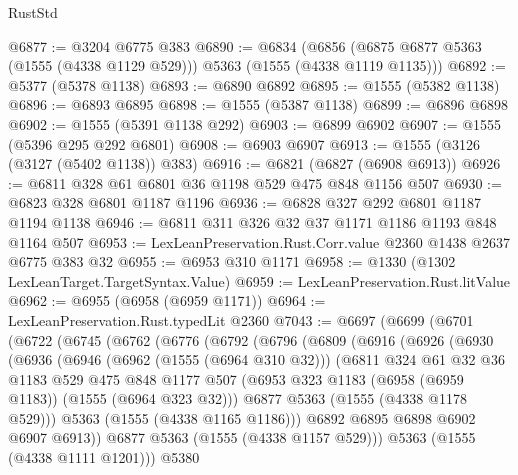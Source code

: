 \begin{lexlean}{RustStd}
\begin{coremodule}
@6877 := @3204 @6775 @383
@6890 := @6834
    (@6856 (@6875 @6877 @5363 (@1555 (@4338 @1129 @529))) @5363 (@1555 (@4338 @1119 @1135)))
@6892 := @5377 (@5378 @1138)
@6893 := @6890 @6892
@6895 := @1555 (@5382 @1138)
@6896 := @6893 @6895
@6898 := @1555 (@5387 @1138)
@6899 := @6896 @6898
@6902 := @1555 (@5391 @1138 @292)
@6903 := @6899 @6902
@6907 := @1555 (@5396 @295 @292 @6801)
@6908 := @6903 @6907
@6913 := @1555 (@3126 (@3127 (@5402 @1138)) @383)
@6916 := @6821 (@6827 (@6908 @6913))
@6926 := @6811 @328 @61 @6801 @36 @1198 @529 @475 @848 @1156 @507
@6930 := @6823 @328 @6801 @1187 @1196
@6936 := @6828 @327 @292 @6801 @1187 @1194 @1138
@6946 := @6811 @311 @326 @32 @37 @1171 @1186 @1193 @848 @1164 @507
@6953 := LexLeanPreservation.Rust.Corr.value @2360 @1438 @2637 @6775 @383 @32
@6955 := @6953 @310 @1171
@6958 := @1330 (@1302 LexLeanTarget.TargetSyntax.Value)
@6959 := LexLeanPreservation.Rust.litValue
@6962 := @6955 (@6958 (@6959 @1171))
@6964 := LexLeanPreservation.Rust.typedLit @2360
@7043 := @6697
    (@6699
      (@6701
        (@6722
          (@6745
            (@6762
              (@6776
                (@6792
                  (@6796
                    (@6809
                      (@6916
                        (@6926
                          (@6930
                            (@6936
                              (@6946
                                (@6962 (@1555 (@6964 @310 @32)))
                                (@6811
                                  @324
                                  @61
                                  @32
                                  @36
                                  @1183
                                  @529
                                  @475
                                  @848
                                  @1177
                                  @507
                                  (@6953 @323 @1183 (@6958 (@6959 @1183)) (@1555 (@6964 @323 @32)))
                                  @6877
                                  @5363
                                  (@1555 (@4338 @1178 @529)))
                                @5363
                                (@1555 (@4338 @1165 @1186)))
                              @6892
                              @6895
                              @6898
                              @6902
                              @6907
                              @6913))
                          @6877
                          @5363
                          (@1555 (@4338 @1157 @529)))
                        @5363
                        (@1555 (@4338 @1111 @1201)))
                      @5380

\end{coremodule}
\end{lexlean}
